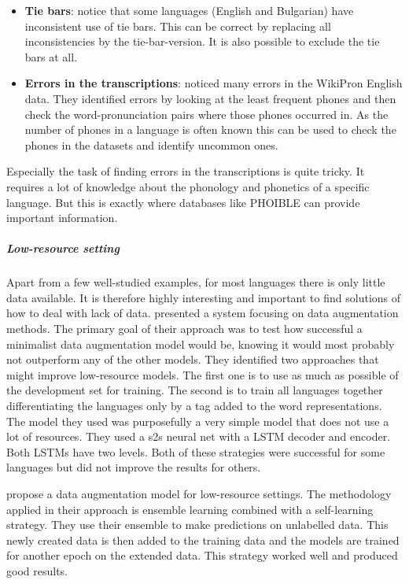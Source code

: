 \begin{itemize}
\item \textbf{Tie bars}: \cite{Ashby-Bartley.2021} notice that some languages (English and Bulgarian) have inconsistent use of tie bars. This can be correct by replacing all inconsistencies by the tie-bar-version. It is also possible to exclude the tie bars at all.
\item \textbf{Errors in the transcriptions}: \citet{gautam.2021} noticed many errors in the WikiPron English data. They identified errors by looking at the least frequent phones and then check the word-pronunciation pairs where those phones occurred in. As the number of phones in a language is often known this can be used to check the phones in the datasets and identify uncommon ones. 
\end{itemize}

Especially the task of finding errors in the transcriptions is quite tricky. It requires a lot of knowledge about the phonology and phonetics of a specific language. But this is exactly where databases like PHOIBLE can provide important information.

\subparagraph{Low-resource setting}
Apart from a few well-studied examples, for most languages there is only little data available. It is therefore highly interesting and important to find solutions of how to deal with lack of data. \cite{hammond-2021-data} presented a system focusing on data augmentation methods. The primary goal of their approach was to test how successful a minimalist data augmentation model would be, knowing it would most probably not outperform any of the other models. They identified two approaches that might improve low-resource models. The first one is to use as much as possible of the development set for training. The second is to train all languages together differentiating the languages only by a tag added to the word representations. The model they used was purposefully a very simple model that does not use a lot of resources. They used a \ac{s2s} neural net with a LSTM decoder and encoder. Both LSTMs have two levels. Both of these strategies were successful for some languages but did not improve the results for others.

\citet{yu-etal-2020} propose a data augmentation model for low-resource settings. The methodology applied in their approach is ensemble learning combined with a self-learning strategy. They use their ensemble to make predictions on unlabelled data. This newly created data is then added to the training data and the models are trained for another epoch on the extended data. This strategy worked well and produced good results. 

